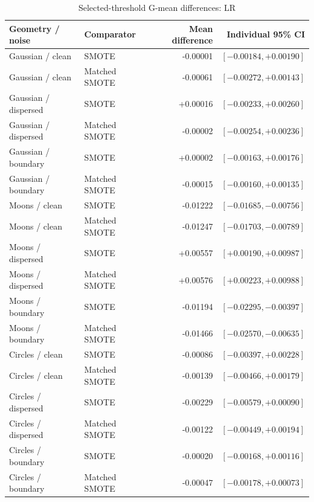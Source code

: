 \begin{table}[htbp]
\caption{Selected-threshold G-mean differences: LR}
\centering\small
\begin{tabular}{llrr}
\hline
Geometry / noise & Comparator & Mean difference & Individual 95\% CI\\
\hline
Gaussian / clean & SMOTE & -0.00001 & $[-0.00184, +0.00190]$ \\
Gaussian / clean & Matched SMOTE & -0.00061 & $[-0.00272, +0.00143]$ \\
Gaussian / dispersed & SMOTE & +0.00016 & $[-0.00233, +0.00260]$ \\
Gaussian / dispersed & Matched SMOTE & -0.00002 & $[-0.00254, +0.00236]$ \\
Gaussian / boundary & SMOTE & +0.00002 & $[-0.00163, +0.00176]$ \\
Gaussian / boundary & Matched SMOTE & -0.00015 & $[-0.00160, +0.00135]$ \\
Moons / clean & SMOTE & -0.01222 & $[-0.01685, -0.00756]$ \\
Moons / clean & Matched SMOTE & -0.01247 & $[-0.01703, -0.00789]$ \\
Moons / dispersed & SMOTE & +0.00557 & $[+0.00190, +0.00987]$ \\
Moons / dispersed & Matched SMOTE & +0.00576 & $[+0.00223, +0.00988]$ \\
Moons / boundary & SMOTE & -0.01194 & $[-0.02295, -0.00397]$ \\
Moons / boundary & Matched SMOTE & -0.01466 & $[-0.02570, -0.00635]$ \\
Circles / clean & SMOTE & -0.00086 & $[-0.00397, +0.00228]$ \\
Circles / clean & Matched SMOTE & -0.00139 & $[-0.00466, +0.00179]$ \\
Circles / dispersed & SMOTE & -0.00229 & $[-0.00579, +0.00090]$ \\
Circles / dispersed & Matched SMOTE & -0.00122 & $[-0.00449, +0.00194]$ \\
Circles / boundary & SMOTE & -0.00020 & $[-0.00168, +0.00116]$ \\
Circles / boundary & Matched SMOTE & -0.00047 & $[-0.00178, +0.00073]$ \\
\hline
\end{tabular}
\end{table}
\clearpage
